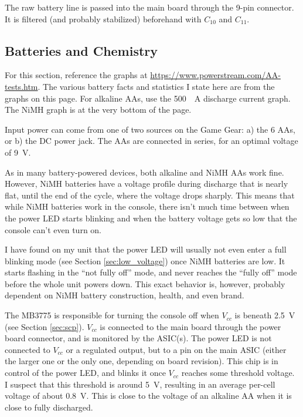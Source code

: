 \documentclass{article}
\newcommand{\Vcc}{$V_{cc}$}
\newcommand{\model}{\textsf}
\begin{document}
The raw battery line is passed into the main board through the 9-pin
connector. It is filtered (and probably stabilized) beforehand with
$C_{10}$ and $C_{11}$.

\subsection{Batteries and Chemistry}
\label{sec:batteries_chemistry}
For this section, reference the graphs at
\url{https://www.powerstream.com/AA-tests.htm}. The various battery
facts and statistics I state here are from the graphs on this
page. For alkaline AAs, use the \qty{500}{\milli{}A} discharge current
graph. The NiMH graph is at the very bottom of the page.

Input power can come from one of two sources on the Game Gear: a) the
6 AAs, or b) the DC power jack. The AAs are connected in series, for
an optimal voltage of \qty{9}{\volt}.

As in many battery-powered devices, both alkaline and NiMH AAs work
fine. However, NiMH batteries have a voltage profile during discharge
that is nearly flat, until the end of the cycle, where the voltage
drops sharply. This means that while NiMH batteries work in the
console, there isn't much time between when the power LED starts
blinking and when the battery voltage gets so low that the console
can't even turn on.

I have found on my unit that the power LED will usually not even enter
a full blinking mode (see Section \ref{sec:low_voltage}) once NiMH
batteries are low. It starts flashing in the ``not fully off'' mode,
and never reaches the ``fully off'' mode before the whole unit powers
down. This exact behavior is, however, probably dependent on NiMH
battery construction, health, and even brand. 

The \model{MB3775} is responsible for turning the console off when
\Vcc{} is beneath \qty{2.5}{\volt} (see Section \ref{sec:scp}). \Vcc{}
is connected to the main board through the power board connector, and
is monitored by the ASIC(s). The power LED is not connected to \Vcc{}
or a regulated output, but to a pin on the main ASIC (either the
larger one or the only one, depending on board revision). This chip is
in control of the power LED, and blinks it once \Vcc{} reaches some
threshold voltage. I suspect that this threshold is around
\qty{5}{\volt}, resulting in an average per-cell voltage of about
\qty{0.8}{\volt}. This is close to the voltage of an alkaline AA when
it is close to fully discharged.
\end{document}
